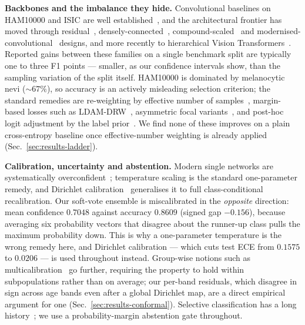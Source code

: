 \documentclass[journal]{IEEEtran}
\begin{document}
\textbf{Backbones and the imbalance they hide.} Convolutional baselines on HAM10000 and ISIC
are well established~\cite{esteva2017,codella2018isic,tschandl2018ham10000}, and the
architectural frontier has moved through residual~\cite{he2016resnet},
densely-connected~\cite{huang2017densenet}, compound-scaled~\cite{tan2019efficientnet} and
modernised-convolutional~\cite{liu2022convnext} designs, and more recently to hierarchical
Vision Transformers~\cite{liu2022swinv2,tu2022maxvit}. Reported gains between these families
on a single benchmark split are typically one to three F1 points --- smaller, as our
confidence intervals show, than the sampling variation of the split itself. HAM10000 is
dominated by melanocytic nevi ($\sim67\%$), so accuracy is an actively misleading selection
criterion; the standard remedies are re-weighting by effective number of
samples~\cite{cui2019classbalanced}, margin-based losses such as LDAM-DRW~\cite{cao2019ldam},
asymmetric focal variants~\cite{ridnik2021asl}, and post-hoc logit adjustment by the label
prior~\cite{menon2021logitadjust,saerens2002adjusting}. We find none of these improves on a
plain cross-entropy baseline once effective-number weighting is already applied
(Sec.~\ref{sec:results-ladder}).

\textbf{Calibration, uncertainty and abstention.} Modern single networks are systematically
overconfident~\cite{guo2017calibration}; temperature scaling is the standard one-parameter
remedy, and Dirichlet calibration~\cite{kull2019dirichlet} generalises it to full
class-conditional recalibration. Our soft-vote ensemble is miscalibrated in the
\emph{opposite} direction: mean confidence $0.7048$ against accuracy $0.8609$ (signed gap
$-0.156$), because averaging six probability vectors that disagree about the runner-up class
pulls the maximum probability down. This is why a one-parameter temperature is the wrong
remedy here, and Dirichlet calibration --- which cuts test ECE from $0.1575$ to $0.0206$ ---
is used throughout instead. Group-wise notions such as
multicalibration~\cite{hebertjohnson2018multicalibration} go further, requiring the property
to hold within subpopulations rather than on average; our per-band residuals, which disagree
in sign across age bands even after a global Dirichlet map, are a direct empirical argument
for one (Sec.~\ref{sec:results-conformal}). Selective classification has a long
history~\cite{elyaniv2010selective,geifman2017selectivenet}; we use a probability-margin
abstention gate throughout.
\end{document}
